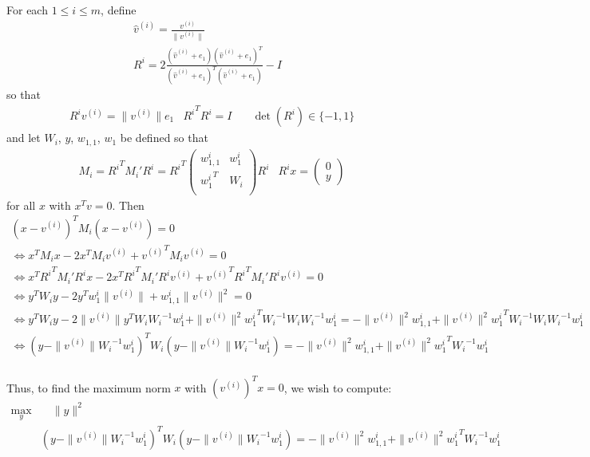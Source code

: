 \documentclass{article}
\theoremstyle{case}
\begin{document}
For each $1 \le i \le m$, define
\begin{align*}
\hat v^{(i)} = \frac{v^{(i)}}{\|v^{(i)}\|} \\
R^i = 2\frac{(\hat v^{(i)} + e_1)(\hat v^{(i)} + e_1)^T}{(\hat v^{(i)} + e_1)^T(\hat v^{(i)} + e_1)} - I
\end{align*}
so that
\begin{align*}
& {R^i}v^{(i)} = \|v^{(i)}\|e_1 & {R^i}^T{R^i} = I & \quad \det({R^i}) \in \{-1, 1\}
\end{align*}
and let $W_i$, $y$, $w_{1,1}$, $w_1$ be defined so that
\begin{align*}
& M_i = {R^i}^T M_i' {R^i} = {R^i}^T\left( \begin{array}{cc}
{w_{1,1}^i} & {w_1^i} \\
{w_1^i}^T	& {W_i}  \\
\end{array} \right){R^i} &
{R^i}x = \left(\begin{array}{c}
0 \\
y
\end{array}\right)
\end{align*}
for all $x$ with $x^Tv = 0$.
Then
\begin{align*}
\left(x - {v^{(i)}}\right)^TM_i\left(x - {v^{(i)}}\right) = 0 \\
\Longleftrightarrow x^TM_ix - 2x^TM_i{v^{(i)}} + {v^{(i)}}^TM_i{v^{(i)}} = 0 \\
\Longleftrightarrow x^T{R^i}^TM_i'{R^i}x - 2x^T{R^i}^TM_i'{R^i}{v^{(i)}} + {v^{(i)}}^T{R^i}^TM_i'{R^i}{v^{(i)}} = 0 \\
\Longleftrightarrow y^T{W_i}y - 2y^T{w_1^i}\|v^{(i)}\| + {w_{1,1}^i}\|v^{(i)}\|^2 = 0 \\
\Longleftrightarrow y^T{W_i}y - 2\|v^{(i)}\|y^T{W_i}{W_i}^{-1}{w_1^i} + \|v^{(i)}\|^2{{w_1^i}}^T{W_i}^{-1}{W_i}{W_i}^{-1}{w_1^i} = - \|v^{(i)}\|^2{w_{1,1}^i} + \|v^{(i)}\|^2{{w_1^i}}^T{W_i}^{-1}{W_i}{W_i}^{-1}{w_1^i} \\
\Longleftrightarrow \left(y - \|v^{(i)}\|{W_i}^{-1}{w_1^i}\right)^T{W_i}\left(y - \|v^{(i)}\|{W_i}^{-1}{w_1^i}\right) = - \|v^{(i)}\|^2{w_{1,1}^i} + \|v^{(i)}\|^2{{{w_1^i}}}^T{W_i}^{-1}{{w_1^i}} \\
\end{align*}

Thus, to find the maximum norm $x$ with $\left(v^{(i)}\right)^Tx = 0$, we wish to compute:
\begin{align*}
\max_{y} & \quad \|y\|^2  \\
 & \left(y - \|v^{(i)}\|{W_i}^{-1}{w_1^i}\right)^T{W_i}\left(y - \|v^{(i)}\|{W_i}^{-1}{w_1^i}\right) = - \|v^{(i)}\|^2{w_{1,1}^i} + \|v^{(i)}\|^2{{w_1^i}}^T{W_i}^{-1}{w_1^i}
\end{align*}
\end{document}
